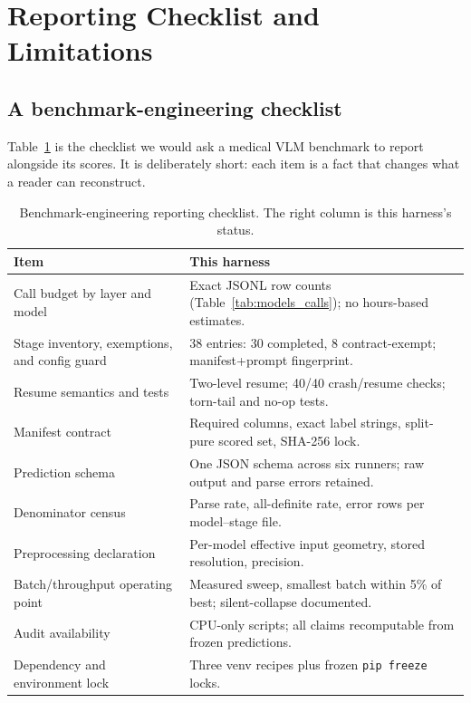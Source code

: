 \section{Reporting Checklist and Limitations}
\label{sec:checklist}

\subsection{A benchmark-engineering checklist}

Table~\ref{tab:checklist} is the checklist we would ask a medical VLM benchmark to report alongside its scores. It is deliberately short: each item is a fact that changes what a reader can reconstruct.

\begin{table}[t]
\centering
\footnotesize
\setlength{\tabcolsep}{3pt}
\caption{Benchmark-engineering reporting checklist. The right column is this harness's status.}
\label{tab:checklist}
\begin{tabular}{p{}p{}}
\toprule
Item & This harness \\
\midrule
Call budget by layer and model & Exact JSONL row counts (Table~\ref{tab:models_calls}); no hours-based estimates. \\
Stage inventory, exemptions, and config guard & 38 entries: 30 completed, 8 contract-exempt; manifest+prompt fingerprint. \\
Resume semantics and tests & Two-level resume; 40/40 crash/resume checks; torn-tail and no-op tests. \\
Manifest contract & Required columns, exact label strings, split-pure scored set, SHA-256 lock. \\
Prediction schema & One JSON schema across six runners; raw output and parse errors retained. \\
Denominator census & Parse rate, all-definite rate, error rows per model--stage file. \\
Preprocessing declaration & Per-model effective input geometry, stored resolution, precision. \\
Batch/throughput operating point & Measured sweep, smallest batch within 5\% of best; silent-collapse documented. \\
Audit availability & CPU-only scripts; all claims recomputable from frozen predictions. \\
Dependency and environment lock & Three venv recipes plus frozen \texttt{pip freeze} locks. \\
\bottomrule
\end{tabular}
\end{table}

